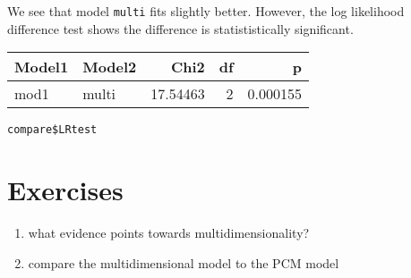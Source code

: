 \documentclass[
]{book}
\providecommand{\tightlist}{%
  \setlength{\itemsep}{0pt}\setlength{\parskip}{0pt}}
\begin{document}
We see that model \texttt{multi} fits slightly better. However, the log likelihood difference test shows the difference is statististically significant.

\begin{tabular}{l|l|r|r|r}
\hline
Model1 & Model2 & Chi2 & df & p\\
\hline
mod1 & multi & 17.54463 & 2 & 0.000155\\
\hline
\end{tabular}

\begin{verbatim}
compare$LRtest
\end{verbatim}

\hypertarget{exercises-1}{%
\section{Exercises}\label{exercises-1}}

\begin{enumerate}
\def\labelenumi{\arabic{enumi}.}
\tightlist
\item
  what evidence points towards multidimensionality?
\item
  compare the multidimensional model to the PCM model
\end{enumerate}

  
\end{document}
